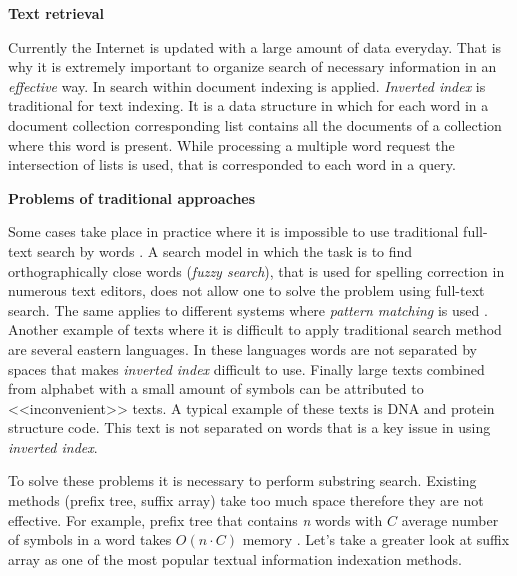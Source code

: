 
\textbf{Text retrieval}

Currently the Internet is updated with a large amount of data everyday.
That is why it is extremely important to organize search of necessary information in an \emph{effective} way.
In search within document indexing is applied.
\emph{Inverted index} is traditional for text indexing.
It is a data structure in which for each word in a document collection corresponding list
contains all the documents of a collection where this word is present.
While processing a multiple word request the intersection of lists is used,
that is corresponded to each word in a query.

\textbf{Problems of traditional approaches}

Some cases take place in practice where it is impossible to use
traditional full-text search by words \cite{bast2013efficient}.
A search model in which the task is to find orthographically close words (\emph{fuzzy search}),
that is used for spelling correction in numerous text editors,
does not allow one to solve the problem using full-text search.
The same applies to different systems where \emph{pattern matching} is used \cite{bai2018adaptive}.
Another example of texts where it is difficult to apply traditional search method
are several eastern languages.
In these languages words are not separated by spaces that makes \emph{inverted index} difficult to use.
Finally large texts combined from alphabet with a small amount of symbols
can be attributed to <<inconvenient>> texts.
A typical example of these texts is DNA and protein structure code.
This text is not separated on words that is a key issue in using \emph{inverted index}.

To solve these problems it is necessary to perform substring search.
Existing methods (prefix tree, suffix array) take too much space therefore they are not effective.
For example, prefix tree that contains \emph{n} words with $C$ average number of symbols in a word
takes $O(n \cdot C)$ memory \cite{aho1975efficient}.
Let's take a greater look at suffix array as one of the most popular textual information indexation methods.

